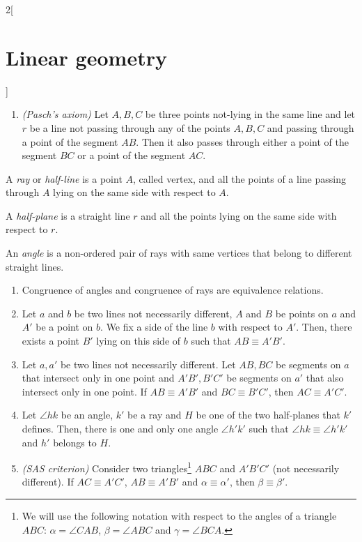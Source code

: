 \documentclass[../../../main.tex]{subfiles}
\begin{document}
\begin{multicols}{2}[\section{Linear geometry}]
\begin{axiom}
\begin{enumerate}
            \item \textit{(Pasch's axiom)} Let $A,B,C$ be three points not-lying in the same line and let $r$ be a line not passing through any of the points $A,B,C$ and passing through a point of the segment $AB$. Then it also passes through either a point of the segment $BC$ or a point of the segment $AC$.
        \end{enumerate}
    \end{axiom}
    \begin{definition}
        A \textit{ray} or \textit{half-line} is a point $A$, called vertex, and all the points of a line passing through $A$ lying on the same side with respect to $A$.
    \end{definition}
    \begin{definition}
        A \textit{half-plane} is a straight line $r$ and all the points lying on the same side with respect to $r$.
    \end{definition}
    \begin{definition}
        An \textit{angle} is a non-ordered pair of rays with same vertices that belong to different straight lines.
    \end{definition}
    \begin{axiom}
        \label{3}
        \hfill
        \begin{enumerate}
            \item Congruence of angles and congruence of rays are equivalence relations.
            \item Let $a$ and $b$ be two lines not necessarily different, $A$ and $B$ be points on $a$ and $A'$ be a point on $b$. We fix a side of the line $b$ with respect to $A'$. Then, there exists a point $B'$ lying on this side of $b$ such that $AB\equiv A'B'$.
            \item Let $a,a'$ be two lines not necessarily different. Let $AB,BC$ be segments on $a$ that intersect only in one point and $A'B',B'C'$ be segments on $a'$ that also intersect only in one point. If $AB\equiv A'B'$ and $BC\equiv B'C'$, then $AC\equiv A'C'$.
            \item Let $\angle hk$ be an angle, $k'$ be a ray and $H$ be one of the two half-planes that $k'$ defines. Then, there is one and only one angle $\angle h'k'$ such that $\angle hk\equiv\angle h'k'$ and $h'$ belongs to $H$.
            \item \textit{(SAS criterion)} Consider two triangles\footnote{We will use the following notation with respect to the angles of a triangle $ABC$: $\alpha=\angle CAB$, $\beta=\angle ABC$ and $\gamma=\angle BCA$.} $ABC$ and $A'B'C'$ (not necessarily different). If $AC\equiv A'C'$, $AB\equiv A'B'$ and $\alpha\equiv\alpha'$, then $\beta\equiv\beta'$.

\end{enumerate}
\end{axiom}
\end{multicols}
\end{document}
